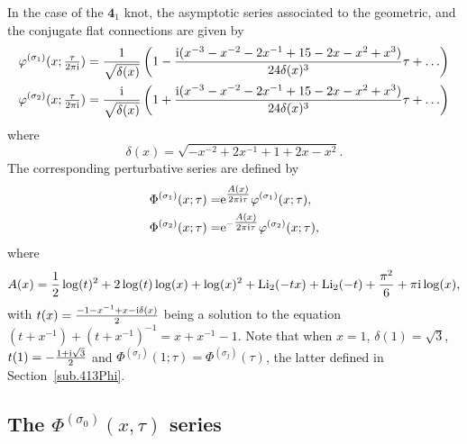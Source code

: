 \documentclass[12pt,reqno]{amsart}
\theoremstyle{definition}
\def\s{\sigma}
\def\Li{\mathrm{Li}}
\def\ri{\mathrm{i}}
\def\re{{\rm e}}
\def\ri{{\rm i}}
\def\md{\mathbf}
\newcommand{\knot}[1]{\md{#1}}
\begin{document}
In the case of the $\knot{4}_1$ knot, the asymptotic series associated to the
geometric, and the conjugate flat connections are given by
\begin{equation}
\label{2phi41}
\begin{aligned}
  \varphi^{(\s_1)}(x;\tfrac{\tau}{2\pi\ri}) &=
  \frac{1}{\sqrt{\delta(x)}} \left(1-\frac{\ri
      (x^{-3}-x^{-2}-2x^{-1}+15-2x-x^2+x^3)} {24\delta(x)^3}\tau
    +\ldots \right)\\
  \varphi^{(\s_2)}(x;\tfrac{\tau}{2\pi\ri}) &= \frac{\ri}
  {\sqrt{\delta(x)}}
  \left(1+\frac{\ri(x^{-3}-x^{-2}-2x^{-1}+15-2x-x^2+x^3)}
    {24\delta(x)^3}\tau+\ldots \right)
\end{aligned}
\end{equation}
where
\begin{equation}
  \delta(x) = \sqrt{-x^{-2}+2x^{-1}+1+2x-x^2}.
\end{equation}
The corresponding perturbative series are defined by
\begin{equation}
\label{eq:Phi1}
  \begin{aligned}
    \Phi^{(\s_1)}(x;\tau) =
    & \re^{\tfrac{A(x)}{2\pi\ri\tau}}
      \varphi^{(\s_1)}(x;\tau),\\
    \Phi^{(\s_2)}(x;\tau) =
    & \re^{-\tfrac{A(x)}{2\pi\ri\tau}}
      \varphi^{(\s_2)}(x;\tau),
\end{aligned}
\end{equation}
where
\begin{equation}
  \label{eq:Axr}
  A(x) = \frac{1}{2} \log(t)^2 + 2 \log(t) \log(x) + \log(x)^2
    + \Li_2(-t x) + 
 \Li_2(-t)+ \frac{\pi^2}{6} + \pi\ri\log(x),
\end{equation}
with $t(x) = \frac{-1-x^{-1}+x -\ri \delta(x)}{2}$ being a solution to
the equation $(t+x^{-1})+(t+x^{-1})^{-1}=x+x^{-1}-1$. Note that when
$x=1$, $\delta(1)=\sqrt{3}$, $t(1)=-\frac{1+\ri \sqrt{3}}{2}$ and
$\Phi^{(\s_j)}(1;\tau)=\Phi^{(\s_j)}(\tau)$, the latter defined in
Section~\ref{sub.413Phi}.

\subsection{The $\Phi^{(\s_0)}(x,\tau)$ series}
\label{sub.41Phi0xq}
\end{document}
